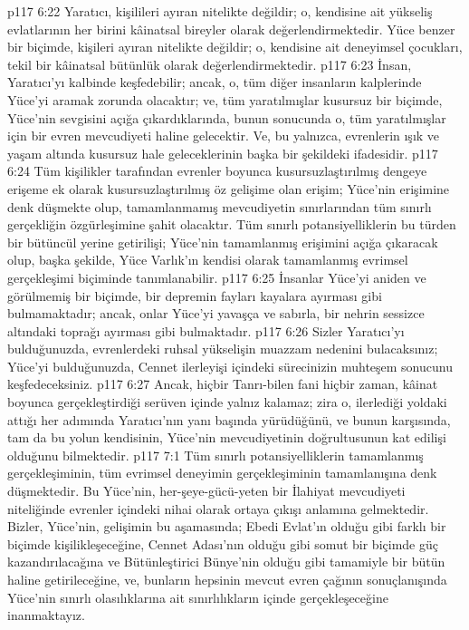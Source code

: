 \vs p117 6:22 Yaratıcı, kişilileri ayıran nitelikte değildir; o, kendisine ait yükseliş evlatlarının her birini kâinatsal bireyler olarak değerlendirmektedir. Yüce benzer bir biçimde, kişileri ayıran nitelikte değildir; o, kendisine ait deneyimsel çocukları, tekil bir kâinatsal bütünlük olarak değerlendirmektedir.
\vs p117 6:23 İnsan, Yaratıcı’yı kalbinde keşfedebilir; ancak, o, tüm diğer insanların kalplerinde Yüce’yi aramak zorunda olacaktır; ve, tüm yaratılmışlar kusursuz bir biçimde, Yüce’nin sevgisini açığa çıkardıklarında, bunun sonucunda o, tüm yaratılmışlar için bir evren mevcudiyeti haline gelecektir. Ve, bu yalnızca, evrenlerin ışık ve yaşam altında kusursuz hale geleceklerinin başka bir şekildeki ifadesidir.
\vs p117 6:24 Tüm kişilikler tarafından evrenler boyunca kusursuzlaştırılmış dengeye erişeme ek olarak kusursuzlaştırılmış öz gelişime olan erişim; Yüce’nin erişimine denk düşmekte olup, tamamlanmamış mevcudiyetin sınırlarından tüm sınırlı gerçekliğin özgürleşimine şahit olacaktır. Tüm sınırlı potansiyelliklerin bu türden bir bütüncül yerine getirilişi; Yüce’nin tamamlanmış erişimini açığa çıkaracak olup, başka şekilde, Yüce Varlık’ın kendisi olarak tamamlanmış evrimsel gerçekleşimi biçiminde tanımlanabilir.
\vs p117 6:25 İnsanlar Yüce’yi aniden ve görülmemiş bir biçimde, bir depremin fayları kayalara ayırması gibi bulmamaktadır; ancak, onlar Yüce’yi yavaşça ve sabırla, bir nehrin sessizce altındaki toprağı ayırması gibi bulmaktadır.
\vs p117 6:26 Sizler Yaratıcı’yı bulduğunuzda, evrenlerdeki ruhsal yükselişin muazzam nedenini bulacaksınız; Yüce’yi bulduğunuzda, Cennet ilerleyişi içindeki sürecinizin muhteşem sonucunu keşfedeceksiniz.
\vs p117 6:27 Ancak, hiçbir Tanrı\hyp{}bilen fani hiçbir zaman, kâinat boyunca gerçekleştirdiği serüven içinde yalnız kalamaz; zira o, ilerlediği yoldaki attığı her adımında Yaratıcı’nın yanı başında yürüdüğünü, ve bunun karşısında, tam da bu yolun kendisinin, Yüce’nin mevcudiyetinin doğrultusunun kat edilişi olduğunu bilmektedir.
\vs p117 7:1 Tüm sınırlı potansiyelliklerin tamamlanmış gerçekleşiminin, tüm evrimsel deneyimin gerçekleşiminin tamamlanışına denk düşmektedir. Bu Yüce’nin, her\hyp{}şeye\hyp{}gücü\hyp{}yeten bir İlahiyat mevcudiyeti niteliğinde evrenler içindeki nihai olarak ortaya çıkışı anlamına gelmektedir. Bizler, Yüce’nin, gelişimin bu aşamasında; Ebedi Evlat’ın olduğu gibi farklı bir biçimde kişilikleşeceğine, Cennet Adası’nın olduğu gibi somut bir biçimde güç kazandırılacağına ve Bütünleştirici Bünye’nin olduğu gibi tamamiyle bir bütün haline getirileceğine, ve, bunların hepsinin mevcut evren çağının sonuçlanışında Yüce’nin sınırlı olasılıklarına ait sınırlılıkların içinde gerçekleşeceğine inanmaktayız.
